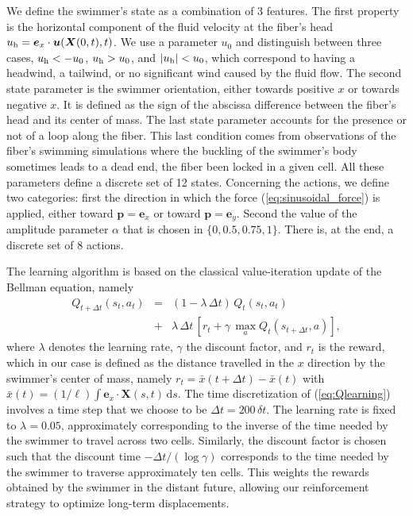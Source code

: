 \documentclass[aps,pre,reprint,superscriptaddress]{revtex4-2}
\newcommand{\bX}{\bm X}
\newcommand{\bu}{\bm u}
\begin{document}
We define the swimmer's state as a combination of 3 features. The first property is the horizontal component of the fluid velocity at the fiber's head $u_{\rm h} = \bm e_x\cdot \bu(\bX(0,t),t)$. We use a parameter $u_0$ and distinguish between three cases, $u_{\rm h}<-u_0$, $u_{\rm h}>u_0$, and $|u_{\rm h}|<u_0$, which correspond to having a headwind, a tailwind, or no significant wind caused by the fluid flow. The second state parameter is the swimmer orientation, either towards positive $x$ or towards negative $x$. It is defined as the sign of the abscissa difference between the fiber's head and its center of mass. The last state parameter accounts for the presence or not of a loop along the fiber. This last condition comes from observations of the fiber's swimming simulations where the buckling of the swimmer's body sometimes leads to a dead end, the fiber been locked in a given cell. All these parameters define a discrete set of 12 states. Concerning the actions, we define two categories: first the direction in which the force (\ref{eq:sinusoidal_force}) is applied, either toward $\bm p = \bm e_{x}$ or toward $\bm p = \bm e_{y}$. Second the value of the amplitude parameter $\alpha$ that is chosen in $ \{0,0.5,0.75,1\}$. There is, at the end, a discrete set of 8 actions. 

The learning algorithm is based on the classical value-iteration update of the Bellman equation, namely
\begin{eqnarray}
    Q_{t+\Delta t}(s_t,a_t) &=& (1-\lambda\,\Delta t)\,Q_{t}(s_t,a_t) \nonumber\\
    &+& \lambda\,\Delta t\,\left[r_t + \gamma\,\max_a Q_{t}(s_{t+\Delta t},a) \right]\!,
    \label{eq:Qlearning}
\end{eqnarray}
where $\lambda$ denotes the learning rate, $\gamma$ the discount factor, and $r_t$ is the reward, which in our case is defined as the distance travelled in the $x$ direction by the swimmer's center of mass, namely $r_t = \bar{x}(t+\Delta t)-\bar{x}(t)$ with $\bar{x}(t) = (1/\ell) \int \bm e_x\cdot\bm X(s,t)\,\mathrm{d}s$. The time discretization of (\ref{eq:Qlearning}) involves a time step that we choose to be $\Delta t = 200\,\delta t$. The learning rate is fixed to $\lambda = 0.05$, approximately corresponding to the inverse of the time needed by the swimmer to travel across two cells. Similarly, the discount factor is chosen such that the discount time $-\Delta t / (\log \gamma)$ corresponds to the time needed by the swimmer to traverse approximately ten cells. This weights the rewards obtained by the swimmer in the distant future, allowing our reinforcement strategy to optimize long-term displacements.
\end{document}
